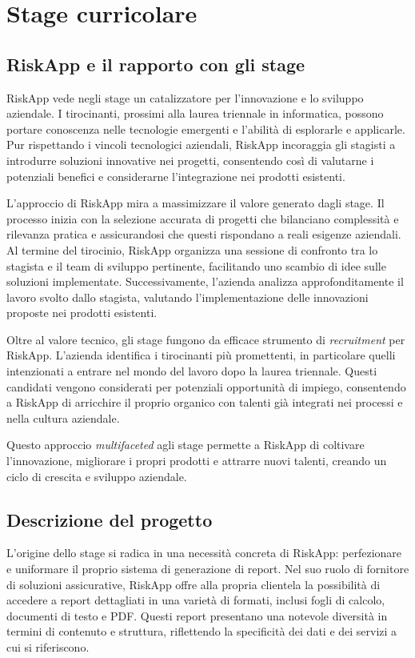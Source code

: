 \chapter{Stage curricolare}
\label{chap:stage_desc}

\section{RiskApp e il rapporto con gli stage}
RiskApp vede negli stage un catalizzatore per l'innovazione e lo sviluppo aziendale. I tirocinanti, prossimi alla laurea triennale in informatica, possono portare conoscenza nelle tecnologie emergenti e l'abilità di esplorarle e applicarle. Pur rispettando i vincoli tecnologici aziendali, RiskApp incoraggia gli stagisti a introdurre soluzioni innovative nei progetti, consentendo così di valutarne i potenziali benefici e considerarne l'integrazione nei prodotti esistenti.

L'approccio di RiskApp mira a massimizzare il valore generato dagli stage. Il processo inizia con la selezione accurata di progetti che bilanciano complessità e rilevanza pratica e assicurandosi che questi rispondano a reali esigenze aziendali. Al termine del tirocinio, RiskApp organizza una sessione di confronto tra lo stagista e il team di sviluppo pertinente, facilitando uno scambio di idee sulle soluzioni implementate. Successivamente, l'azienda analizza approfonditamente il lavoro svolto dallo stagista, valutando l'implementazione delle innovazioni proposte nei prodotti esistenti.

Oltre al valore tecnico, gli stage fungono da efficace strumento di \textit{recruitment} per RiskApp. L'azienda identifica i tirocinanti più promettenti, in particolare quelli intenzionati a entrare nel mondo del lavoro dopo la laurea triennale. Questi candidati vengono considerati per potenziali opportunità di impiego, consentendo a RiskApp di arricchire il proprio organico con talenti già integrati nei processi e nella cultura aziendale.

Questo approccio \textit{multifaceted} agli stage permette a RiskApp di coltivare l'innovazione, migliorare i propri prodotti e attrarre nuovi talenti, creando un ciclo di crescita e sviluppo aziendale.

\section{Descrizione del progetto}
L'origine dello stage si radica in una necessità concreta di RiskApp: perfezionare e uniformare il proprio sistema di generazione di report. Nel suo ruolo di fornitore di soluzioni assicurative, RiskApp offre alla propria clientela la possibilità di accedere a report dettagliati in una varietà di formati, inclusi fogli di calcolo, documenti di testo e PDF. Questi report presentano una notevole diversità in termini di contenuto e struttura, riflettendo la specificità dei dati e dei servizi a cui si riferiscono.

